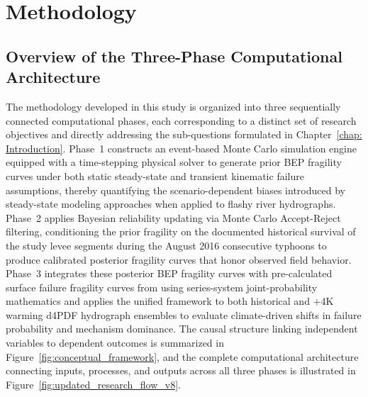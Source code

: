 \chapter{Methodology}
\label{chap: Methodology}

\section{Overview of the Three-Phase Computational Architecture}
\label{sec: Overview of the Three-Phase Computational Architecture}

The methodology developed in this study is organized into three sequentially
connected computational phases, each corresponding to a distinct set of
research objectives and directly addressing the sub-questions formulated in
Chapter~\ref{chap: Introduction}. Phase~1 constructs an event-based Monte
Carlo simulation engine equipped with a time-stepping physical solver to
generate prior BEP fragility curves under both static steady-state and
transient kinematic failure assumptions, thereby quantifying the
scenario-dependent biases introduced by steady-state modeling approaches when
applied to flashy river hydrographs. Phase~2 applies Bayesian reliability
updating via Monte Carlo Accept-Reject filtering, conditioning the prior
fragility on the documented historical survival of the study levee segments
during the August 2016 consecutive typhoons to produce calibrated posterior
fragility curves that honor observed field behavior. Phase~3 integrates these
posterior BEP fragility curves with pre-calculated surface failure fragility
curves from \textcite{uemura_phd_2025} using series-system joint-probability
mathematics and applies the unified framework to both historical and +4K
warming d4PDF hydrograph ensembles to evaluate climate-driven shifts in
failure probability and mechanism dominance. The causal
structure linking independent variables to dependent outcomes is summarized in
Figure~\ref{fig:conceptual_framework}, and the complete computational
architecture connecting inputs, processes, and outputs across all three phases
is illustrated in Figure~\ref{fig:updated_research_flow_v8}.

